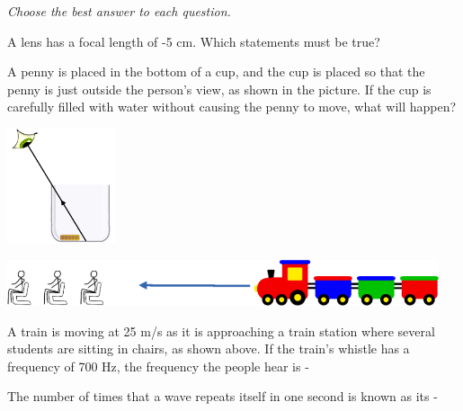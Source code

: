\documentclass[10pt]{examdesign}
\begin{document}
\begin{multiplechoice} [title={Multiple Choice (3 Points Each)},
	rearrange=No]
	\textit{Choose the best answer to each question.} 
	
	\begin{question}
	A lens has a focal length of -5 cm.  Which statements must be true?
	\end{question}



	\begin{question}
	A penny is placed in the bottom of a cup, and the cup is placed so that the penny is just outside the person's view, as shown in the picture.  If the cup is carefully filled with water without causing the penny to move, what will happen?
		
	\begin{center} \includegraphics[width=1.25in]{penny.png} \end{center}

\end{question}

\begin{block}
	
	\includegraphics[width=5in]{train.png} 
	
	
	\begin{question}
		A train is moving at 25 m/s as it is approaching a train station where several students are sitting in chairs, as shown above.  If the train's whistle has a frequency of 700 Hz, the frequency the people hear is - 

	\end{question}
\end{block}


\begin{question}
	The number of times that a wave repeats itself in one second is known as its - 


\end{question}
\end{multiplechoice}
\end{document}
